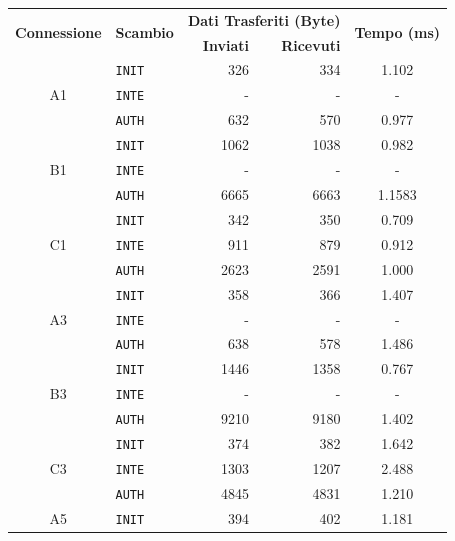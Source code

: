 \begin{table}[h!] 
    \centering 
    \begin{tabular}{clrrc} 
        \toprule
        \multirow{2}{*}{\textbf{Connessione}} & \multirow{2}{*}{\textbf{Scambio}} & \multicolumn{2}{c}{\textbf{Dati Trasferiti (Byte)}} & \multirow{2}{*}{\textbf{Tempo (ms)}} \\
        \cline{3-4} & & \textbf{Inviati} & \textbf{Ricevuti} \\
        \toprule
        \multirow{3}{*}{A1} & \texttt{INIT} & 326 & 334 & 1.102 \\ 
                            & \texttt{INTE} & - & - & - \\
                            & \texttt{AUTH} &  632 & 570 & 0.977 \\ 
        \hline
        \multirow{3}{*}{B1} & \texttt{INIT} & 1062 & 1038 & 0.982 \\ 
                            & \texttt{INTE} & - & - & - \\
                            & \texttt{AUTH} & 6665 & 6663 & 1.1583 \\ 
        \hline
        \multirow{3}{*}{C1} & \texttt{INIT} & 342 & 350 & 0.709 \\ 
                            & \texttt{INTE} & 911 & 879 & 0.912 \\
                            & \texttt{AUTH} & 2623 & 2591 & 1.000 \\ 
        \hline
        \multirow{3}{*}{A3} & \texttt{INIT} & 358 & 366 & 1.407 \\ 
                            & \texttt{INTE} & - & - & - \\
                            & \texttt{AUTH} & 638 & 578 & 1.486 \\ 
        \hline
        \multirow{3}{*}{B3} & \texttt{INIT} & 1446 & 1358 & 0.767 \\ 
                            & \texttt{INTE} & - & - & - \\
                            & \texttt{AUTH} & 9210 & 9180 & 1.402 \\ 
        \hline
        \multirow{3}{*}{C3} & \texttt{INIT} & 374 & 382 & 1.642 \\ 
                            & \texttt{INTE} & 1303 & 1207 & 2.488 \\
                            & \texttt{AUTH} & 4845 & 4831 & 1.210 \\ 
        \hline
        \multirow{3}{*}{A5} & \texttt{INIT} & 394 & 402 & 1.181 \\ 

\end{tabular}
\end{table}

